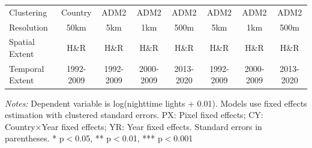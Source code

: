 \begin{table}[htbp]
\begin{tabular}{lccccccc}
Clustering & Country & ADM2 & ADM2 & ADM2 & ADM2 & ADM2 & ADM2 \\
Resolution & 50km & 5km & 1km & 500m & 5km & 1km & 500m \\
Spatial Extent & H\&R & H\&R & H\&R & H\&R & H\&R & H\&R & H\&R \\
Temporal Extent & 1992-2009 & 1992-2009 & 2000-2009 & 2013-2020 & 1992-2009 & 2000-2009 & 2013-2020 \\
\bottomrule
\end{tabular}
\begin{threeparttable}
\begin{tablenotes}\small
\item \textit{Notes:} Dependent variable is log(nighttime lights + 0.01). Models use  fixed effects estimation with clustered standard errors. PX: Pixel fixed effects; CY: Country×Year fixed effects; YR: Year fixed effects. Standard errors in parentheses. * p$<$0.05, ** p$<$0.01, *** p$<$0.001
\end{tablenotes}
\end{threeparttable}
\end{table}